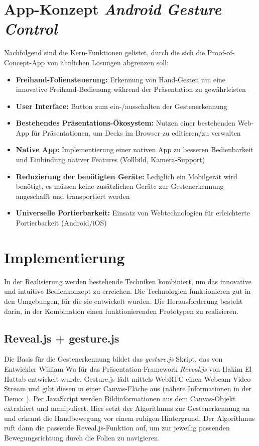 \documentclass{article}
\begin{document}
\section{App-Konzept \textit{Android Gesture Control}}
Nachfolgend sind die Kern-Funktionen gelistet, durch die sich die Proof-of-Concept-App von ähnlichen Lösungen abgrenzen soll:

\begin{itemize}
\item \textbf{Freihand-Foliensteuerung:} Erkennung von Hand-Gesten um eine innovative Freihand-Bedienung während der Präsentation zu gewährleisten
\item \textbf{User Interface:} Button zum ein-/ausschalten der Gestenerkennung
\item \textbf{Bestehendes Präsentations-Ökosystem:} Nutzen einer bestehenden Web-App für Präsentationen, um Decks im Browser zu editieren/zu verwalten
\item \textbf{Native App:} Implementierung  einer nativen App zu besseren Bedienbarkeit und Einbindung nativer Features (Vollbild, Kamera-Support)
\item \textbf{Reduzierung der benötigten Geräte:} Lediglich ein Mobilgerät wird benötigt, es müssen keine zusätzlichen Geräte zur Gestenerkennung angeschafft und transportiert werden
\item \textbf{Universelle Portierbarkeit:} Einsatz von Webtechnologien für erleichterte Portierbarkeit (Android/iOS)
\end{itemize}

\section{Implementierung}
In der Realisierung werden bestehende Techniken kombiniert, um das innovative und intuitive Bedienkonzept zu erreichen. Die Technologien funktionieren gut in den Umgebungen, für die sie entwickelt wurden. Die Herausforderung besteht darin, in der Kombination einen funktionierenden Prototypen zu realisieren.

\subsection{Reveal.js + gesture.js}
Die Basis für die Gestenerkennung bildet das \textit{gesture.js} Skript, das von Entwickler William Wu für das Präsentation-Framework \textit{Reveal.js} \cite{Hattab2015} von Hakim El Hattab entwickelt wurde. Gesture.js lädt mittels WebRTC einen Webcam-Video-Stream und gibt diesen in einer Canvas-Fläche aus (nähere Informationen in der Demo: \cite{Wu}). Per JavaScript werden Bildinformationen aus dem Canvas-Objekt extrahiert und manipuliert. Hier setzt der Algorithmus zur Gestenerkennung an und erkennt die Handbewegung vor einem ruhigen Hintergrund. Der Algorithmus ruft dann die passende Reveal.js-Funktion auf, um zur jeweilig passenden Bewegungsrichtung durch die Folien zu navigieren.
\end{document}
